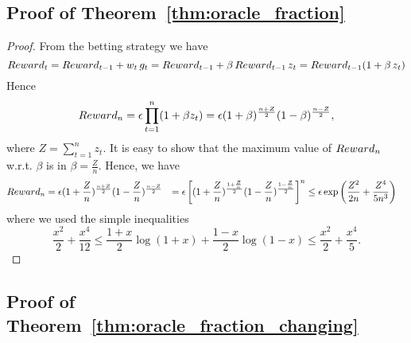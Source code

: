 \subsection{Proof of Theorem~\ref{thm:oracle_fraction}}
\begin{proof}
From the betting strategy we have
\[
Reward_t=Reward_{t-1} + w_t \, g_t = Reward_{t-1} + \beta \, Reward_{t-1} \, z_t = Reward_{t-1} (1+\beta \, z_t)
\]
Hence
\[
Reward_n=\epsilon \prod_{t=1}^n (1+\beta z_t) = \epsilon (1+\beta)^\frac{n+Z}{2} (1-\beta)^\frac{n-Z}{2},
\]
where $Z=\sum_{t=1}^n z_t$.
It is easy to show that the maximum value of $Reward_n$ w.r.t. $\beta$ is in $\beta=\frac{Z}{n}$. 
Hence, we have
\begin{align}
Reward_n &= \epsilon (1+\frac{Z}{n})^\frac{n+Z}{2} (1-\frac{Z}{n})^\frac{n-Z}{2} 
&= \epsilon \left[(1+\frac{Z}{n})^\frac{1+\frac{Z}{n}}{2} (1-\frac{Z}{n})^\frac{1-\frac{Z}{n}}{2}\right]^n
&\leq \epsilon \exp \left(\frac{Z^2}{2 n} + \frac{Z^4}{5 n^3}\right)
\end{align}
where we used the simple inequalities
\[
\frac{x^2}{2} +\frac{x^4}{12}\leq \frac{1+x}{2} \log(1+x) + \frac{1-x}{2}\log(1-x) \leq \frac{x^2}{2} + \frac{x^4}{5}.
\]
\end{proof}


\subsection{Proof of Theorem~\ref{thm:oracle_fraction_changing}}

